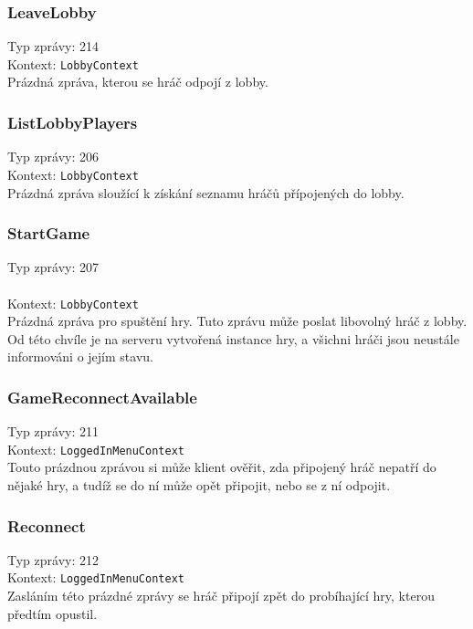 \documentclass[12pt, a4paper]{article}
\begin{document}
    \subsubsection*{LeaveLobby}
    Typ zprávy: 214\\
    Kontext: \texttt{LobbyContext}\\

    Prázdná zpráva, kterou se hráč odpojí z lobby.

    \subsubsection*{ListLobbyPlayers}
    Typ zprávy: 206\\
    Kontext: \texttt{LobbyContext}\\

    Prázdná zpráva sloužící k získání seznamu hráčů přípojených do lobby.

    \subsubsection*{StartGame}
    Typ zprávy: 207\\\\
    Kontext: \texttt{LobbyContext}\\

    Prázdná zpráva pro spuštění hry.
    Tuto zprávu může poslat libovolný hráč z lobby.
    Od této chvíle je na serveru vytvořená instance hry, a všichni hráči jsou neustále informováni o jejím stavu.

    \subsubsection*{GameReconnectAvailable}
    Typ zprávy: 211\\
    Kontext: \texttt{LoggedInMenuContext}\\

    Touto prázdnou zprávou si může klient ověřit, zda připojený hráč nepatří do nějaké hry, a tudíž se do ní může opět připojit, nebo se z ní odpojit.

    \subsubsection*{Reconnect}
    Typ zprávy: 212\\
    Kontext: \texttt{LoggedInMenuContext}\\

    Zasláním této prázdné zprávy se hráč připojí zpět do probíhající hry, kterou předtím opustil.
\end{document}
